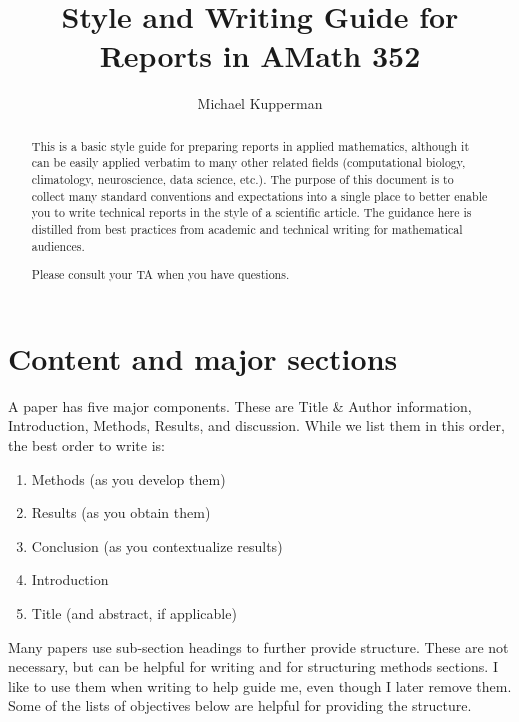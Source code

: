 \documentclass[]{article}
\title{Style and Writing Guide for Reports in AMath 352}
\author{Michael Kupperman}
\begin{document}
\maketitle
\begin{abstract}
    This is a basic style guide for preparing reports in applied mathematics, although it can be easily applied verbatim to many other related fields (computational biology, climatology, neuroscience, data science, etc.). The purpose of this document is to collect many standard conventions and expectations into a single place to better enable you to write technical reports in the style of a scientific article. The guidance here is distilled from best practices from academic and technical writing for mathematical audiences.

Please consult your TA when you have questions.

\end{abstract}
\tableofcontents

\section{Content and major sections}

A paper has five major components. These are Title \& Author information, Introduction, Methods, Results, and discussion. While we list them in this order, the best order to write is:

\begin{enumerate}
    \item Methods (as you develop them)
    \item Results (as you obtain them)
    \item Conclusion (as you contextualize results)
    \item Introduction
    \item Title (and abstract, if applicable)
\end{enumerate}
Many papers use sub-section headings to further provide structure. These are not necessary, but can be helpful for writing and for structuring methods sections.
I like to use them when writing to help guide me, even though I later remove them. Some of the lists of objectives below are helpful for providing the structure.
\end{document}
